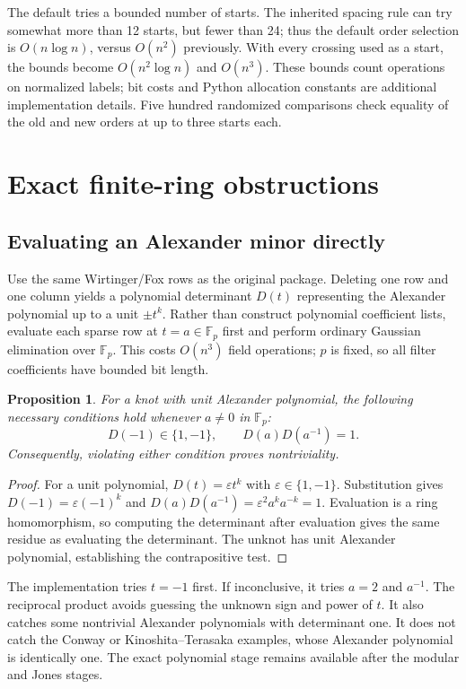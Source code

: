 \documentclass[11pt]{article}
\newtheorem{proposition}[theorem]{Proposition}
\theoremstyle{definition}\newtheorem{definition}[theorem]{Definition}
\theoremstyle{remark}\newtheorem{remark}[theorem]{Remark}
\begin{document}
The default tries a bounded number of starts. The inherited spacing rule can
try somewhat more than 12 starts, but fewer than 24; thus the default order
selection is $O(n\log n)$, versus $O(n^2)$ previously. With every crossing used
as a start, the bounds become $O(n^2\log n)$ and $O(n^3)$. These bounds count
operations on normalized labels; bit costs and Python allocation constants
are additional implementation details. Five hundred randomized comparisons
check equality of the old and new orders at up to three starts each.

\section{Exact finite-ring obstructions}\label{sec:filters}
\subsection{Evaluating an Alexander minor directly}
Use the same Wirtinger/Fox rows as the original package. Deleting one row and
one column yields a polynomial determinant $D(t)$ representing the Alexander
polynomial up to a unit $\pm t^k$. Rather than construct polynomial coefficient
lists, evaluate each sparse row at $t=a\in\mathbb F_p$ first and perform ordinary
Gaussian elimination over $\mathbb F_p$. This costs $O(n^3)$ field operations;
$p$ is fixed, so all filter coefficients have bounded bit length.

\begin{proposition}\label{prop:alexfilter}
For a knot with unit Alexander polynomial, the following necessary conditions
hold whenever $a\ne0$ in $\mathbb F_p$:
\[
 D(-1)\in\{1,-1\},\qquad D(a)D(a^{-1})=1.
\]
Consequently, violating either condition proves nontriviality.
\end{proposition}
\begin{proof}
For a unit polynomial, $D(t)=\varepsilon t^k$ with
$\varepsilon\in\{1,-1\}$. Substitution gives
$D(-1)=\varepsilon(-1)^k$ and
$D(a)D(a^{-1})=\varepsilon^2 a^ka^{-k}=1$. Evaluation is a ring
homomorphism, so computing the determinant after evaluation gives the same
residue as evaluating the determinant. The unknot has unit Alexander
polynomial, establishing the contrapositive test.
\end{proof}
The implementation tries $t=-1$ first. If inconclusive, it tries $a=2$ and
$a^{-1}$. The reciprocal product avoids guessing the unknown sign and power
of $t$. It also catches some nontrivial Alexander polynomials with determinant
one. It does not catch the Conway or Kinoshita--Terasaka examples, whose
Alexander polynomial is identically one. The exact polynomial stage remains
available after the modular and Jones stages.
\end{document}
